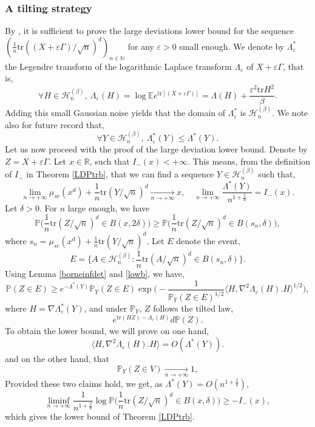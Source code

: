 \documentclass[aop,preprint]{imsart}
\newcommand\NN{\mathbb{N}}
\newcommand\RR{\mathbb{R}}
\newcommand\PP{\mathbb{P}}
\newcommand\EE{\mathbb{E}}
\newcommand\tr{\mathrm{tr}}
\newcommand\eps{\varepsilon}
\numberwithin{equation}{section}
\theoremstyle{definition}
\theoremstyle{plain}
\theoremstyle{remark}
\begin{document}
\subsubsection{A tilting strategy}
By \cite[Theorem 4.2.16]{DZ}, it is sufficient  to prove the large deviations lower bound for the sequence $(\frac{1}{n}\tr ((X+\eps \Gamma)/\sqrt{n})^d)_{n\in\NN}$ for any $\eps>0$ small enough. We denote by $\Lambda^*_\eps$ the Legendre transform of the logarithmic Laplace transform $\Lambda_\eps$ of $X+\eps \Gamma$, that is,
$$\forall H \in \mathcal{H}_n^{(\beta)}, \ \Lambda_\eps(H) = \log \EE e^{\tr [(X+\eps \Gamma)]} = \Lambda(H) + \frac{\eps^2 \tr H^2}{\beta}.$$
Adding this small Gaussian noise yields that the domain of $\Lambda^*_{\eps}$ is $\mathcal{H}_n^{(\beta)}$. We note also for future record that, 
\begin{equation} \label{lowb}\forall Y \in \mathcal{H}_n^{(\beta)}, \  \Lambda^*_{\eps}(Y) \leq \Lambda^*(Y).\end{equation}
Let us now proceed with the proof of the large deviation lower bound. Denote by $Z = X + \eps \Gamma$. Let $x \in \RR$, such that $I_-(x)<+\infty$. This means, from the definition of $I_-$ in Theorem \ref{LDPtrb}, that we can find a sequence $Y \in \mathcal{H}_n^{(\beta)}$ such that,
\begin{equation} \label{conv} \lim_{n\to +\infty} \mu_{sc}(x^d) + \frac{1}{n} \tr(Y/\sqrt{n})^d \underset{n\to +\infty}{\longrightarrow} x, \quad \lim_{n\to +\infty} \frac{\Lambda^*(Y)}{n^{1+\frac{2}{d}}} = I_-(x).\end{equation}
Let $\delta>0$. For $n$ large enough, we have
$$ \PP\Big( \frac{1}{n}\tr(Z /\sqrt{n})^d \in B(x,2\delta)\Big) \geq \PP\Big( \frac{1}{n} \tr(Z/\sqrt{n})^d \in B(s_n, \delta) \Big),$$
where $s_n = \mu_{sc}(x^d) + \frac{1}{n} \tr(Y/\sqrt{n})^d$. Let $E$ denote the event,
$$ E = \big\{A \in \mathcal{H}_n^{(\beta)} : \frac{1}{n}\tr(A/\sqrt{n})^d \in B(s_n,\delta) \big\}.$$
Using  Lemma \ref{borneinfdet} and \eqref{lowb}, we have,
$$ \PP( Z  \in E) \geq e^{-\Lambda^*(Y)} \PP_{Y}(Z \in E) \exp\Big( - \frac{1}{\PP_{Y}(Z\in E)^{1/2}} \langle H, \nabla^2 \Lambda_{\eps}(H).H\rangle^{1/2}\Big),$$
where $H = \nabla \Lambda^*_{\eps}(Y)$, and under $\PP_{Y}$, $Z$ follows the tilted law,
$$ e^{\tr (HZ) - \Lambda_{\eps}(H)} d\PP(Z).$$
To obtain the lower bound, we will prove on one hand,
\begin{equation} \label{claim1}\langle H, \nabla^2 \Lambda_{\eps}(H).H\rangle = O(\Lambda^*(Y)).\end{equation}
and on the other hand,
that 
\begin{equation} \label{claim2} \PP_{Y}(Z\in V) \underset{n\to+\infty}{\longrightarrow} 1,\end{equation}
Provided these two claims hold, we get, as $\Lambda^*(Y) = O(n^{1+\frac{2}{d}})$,
$$ \liminf_{n\to +\infty} \frac{1}{n^{1+\frac{2}{d}}} \log \PP\Big( \frac{1}{n}\tr(Z/\sqrt{n})^d \in B(x,\delta)\Big) \geq - I_-(x),$$
which gives the lower bound of Theorem \ref{LDPtrb}.
\end{document}
